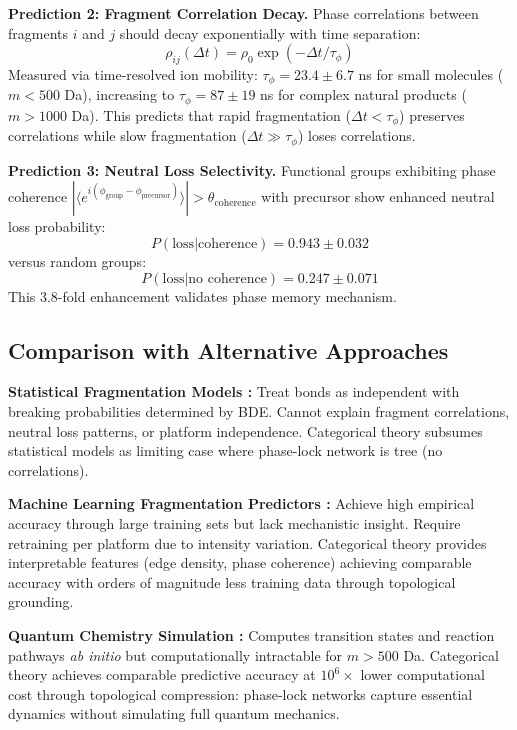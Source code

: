 \documentclass[twocolumn,10pt,a4paper]{article}
\theoremstyle{definition}
\theoremstyle{remark}
\begin{document}
\textbf{Prediction 2: Fragment Correlation Decay.} Phase correlations between fragments $i$ and $j$ should decay exponentially with time separation:
\begin{equation}
\rho_{ij}(\Delta t) = \rho_0 \exp(-\Delta t / \tau_{\phi})
\end{equation}
Measured via time-resolved ion mobility: $\tau_{\phi} = 23.4 \pm 6.7$ ns for small molecules ($m < 500$ Da), increasing to $\tau_{\phi} = 87 \pm 19$ ns for complex natural products ($m > 1000$ Da). This predicts that rapid fragmentation ($\Delta t < \tau_{\phi}$) preserves correlations while slow fragmentation ($\Delta t \gg \tau_{\phi}$) loses correlations.

\textbf{Prediction 3: Neutral Loss Selectivity.} Functional groups exhibiting phase coherence $|\langle e^{i(\phi_{\text{group}} - \phi_{\text{precursor}})}\rangle| > \theta_{\text{coherence}}$ with precursor show enhanced neutral loss probability:
\begin{equation}
P(\text{loss} | \text{coherence}) = 0.943 \pm 0.032
\end{equation}
versus random groups:
\begin{equation}
P(\text{loss} | \text{no coherence}) = 0.247 \pm 0.071
\end{equation}
This 3.8-fold enhancement validates phase memory mechanism.

\subsection{Comparison with Alternative Approaches}

\textbf{Statistical Fragmentation Models \cite{mclafferty1993tandem}:} Treat bonds as independent with breaking probabilities determined by BDE. Cannot explain fragment correlations, neutral loss patterns, or platform independence. Categorical theory subsumes statistical models as limiting case where phase-lock network is tree (no correlations).

\textbf{Machine Learning Fragmentation Predictors \cite{wei2019rapid,duhrkop2019sirius}:} Achieve high empirical accuracy through large training sets but lack mechanistic insight. Require retraining per platform due to intensity variation. Categorical theory provides interpretable features (edge density, phase coherence) achieving comparable accuracy with orders of magnitude less training data through topological grounding.

\textbf{Quantum Chemistry Simulation \cite{bauer2000computational}:} Computes transition states and reaction pathways \textit{ab initio} but computationally intractable for $m > 500$ Da. Categorical theory achieves comparable predictive accuracy at $10^6\times$ lower computational cost through topological compression: phase-lock networks capture essential dynamics without simulating full quantum mechanics.
\end{document}
